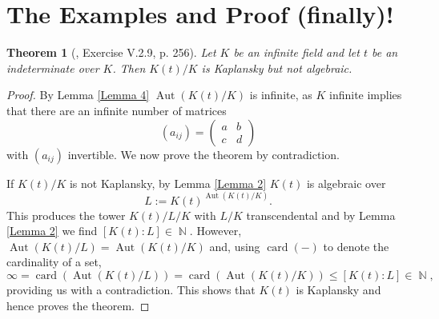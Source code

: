 \documentclass[10pt]{article}
\newtheorem{Theorem}{Theorem}
\DeclareMathOperator{\N}{\mathbb{N}}
\DeclareMathOperator{\aut}{Aut}
\DeclareMathOperator{\aut}{rank}
\DeclareMathOperator{\card}{card}
\numberwithin{Theorem}{section}
\begin{document}
\section{The Examples and Proof (finally)!}
\begin{Theorem}[\cite{Hungerford}, Exercise V.2.9, p. 256]
Let $K$ be an infinite field and let $t$ be an indeterminate over $K$. Then $K(t)/K$ is Kaplansky but not algebraic.
\end{Theorem}
\begin{proof}
By Lemma \ref{Lemma 4} $\aut(K(t)/K)$ is infinite, as $K$ infinite implies that there are an infinite number of matrices
\[
 (a_{ij}) = \begin{pmatrix}
a & b \\
c & d
\end{pmatrix} 
\]
with $(a_{ij})$ invertible. We now prove the theorem by contradiction. 

If $K(t)/K$ is not Kaplansky, by Lemma \ref{Lemma 2} $K(t)$ is algebraic over
$$ L := K(t)^{\aut(K(t)/K)}.$$
This produces the tower $K(t)/L/K$ with $L/K$ transcendental and by Lemma \ref{Lemma 2} we find $[K(t):L] \in \N$. However, $\aut(K(t)/L) = \aut(K(t)/K)$ and, using $\card(-)$ to denote the cardinality of a set,
$$ \infty = \card(\aut(K(t)/L)) = \card(\aut(K(t)/K)) \leq [K(t): L] \in \N,$$
providing us with a contradiction. This shows that $K(t)$ is Kaplansky and hence proves the theorem. 
\end{proof}
\end{document}
